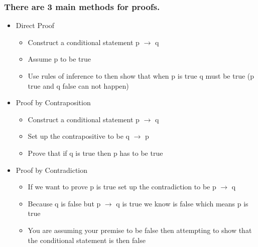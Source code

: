 \documentclass[11pt]{article}
\begin{document}
\subsubsection{There are 3 main methods for proofs.}
\label{sec-1-7-1}
\begin{itemize}

\item Direct Proof
\label{sec-1-7-1-1}%
\begin{itemize}

\item Construct a conditional statement p $\rightarrow$ q
\label{sec-1-7-1-1-1}%

\item Assume p to be true
\label{sec-1-7-1-1-2}%

\item Use rules of inference to then show that when p is true q must be true (p true and q false can not happen)
\label{sec-1-7-1-1-3}%
\end{itemize} %

\item Proof by Contraposition
\label{sec-1-7-1-2}%
\begin{itemize}

\item Construct a conditional statement p $\rightarrow$ q
\label{sec-1-7-1-2-1}%

\item Set up the contrapositive to be \textlnot q $\rightarrow$ \textlnot p
\label{sec-1-7-1-2-2}%

\item Prove that if \textlnot q is true then \textlnot p has to be true
\label{sec-1-7-1-2-3}%
\end{itemize} %

\item Proof by Contradiction
\label{sec-1-7-1-3}%
\begin{itemize}

\item If we want to prove p is true set up the contradiction to be \textlnot p $\rightarrow$ q
\label{sec-1-7-1-3-1}%

\item Because q is false but \textlnot p $\rightarrow$ q is true we know \textlnotp is false which means p is true
\label{sec-1-7-1-3-2}%

\item You are assuming your premise to be false then attempting to show that the conditional statement is then false
\label{sec-1-7-1-3-3}%
\end{itemize} %
\end{itemize} %
\end{document}
